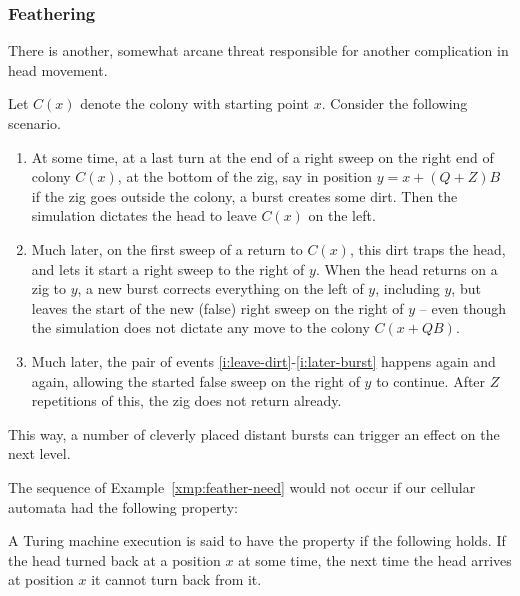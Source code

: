 \documentclass[12pt]{memoir}
\def\B{B}
\newcommand{\Z}{Z}
\begin{document}
\subsubsection{Feathering}\label{sec:feathering}

There is another, somewhat arcane
threat responsible for another complication in head movement.

\begin{example}\label{xmp:feather-need}
Let \( C(x) \) denote the colony with starting point \( x \).
Consider the following scenario.

\begin{enumerate}
\item\label{i:leave-dirt}
At some time, at a last turn at the end of a right sweep on the right end of
colony \( C(x) \), at the bottom of the zig, say in
position \( y = x+(Q+Z)\B \) if the zig goes outside the colony, a burst creates some dirt.
Then the simulation dictates the head to leave \( C(x) \) on the left.

\item\label{i:later-burst} 
Much later, on the first sweep of a return to \( C(x) \), this dirt traps the head, and
lets it start a right sweep to the right of \( y \).  
When the head returns on a zig to \( y \), 
a new burst corrects everything on the left of \( y \), including \( y \), but leaves
the start of the new (false) right sweep on the right of \( y \) -- even though
the simulation does not dictate any move to the colony \( C(x+Q\B) \).

\item\label{i:repeat} Much later, the pair of events \ref{i:leave-dirt}-\ref{i:later-burst}
happens again and again, allowing the started false sweep on the right of \( y \) to continue.
After \( \Z \) repetitions of this, the zig does not return already.

\end{enumerate}
This way, a number of cleverly placed distant bursts can trigger an effect on the
next level.

\end{example}

The sequence of Example~\ref{xmp:feather-need} would not occur if
our cellular automata had the following property:

\begin{definition}[Feathering]\label{def:feathering}
A Turing machine execution is said to have the  property if the following holds.
If the head turned back at a position \( x \) at some time, 
the next time the head arrives at position \( x \) it cannot turn back from it.
\end{definition}
\end{document}
